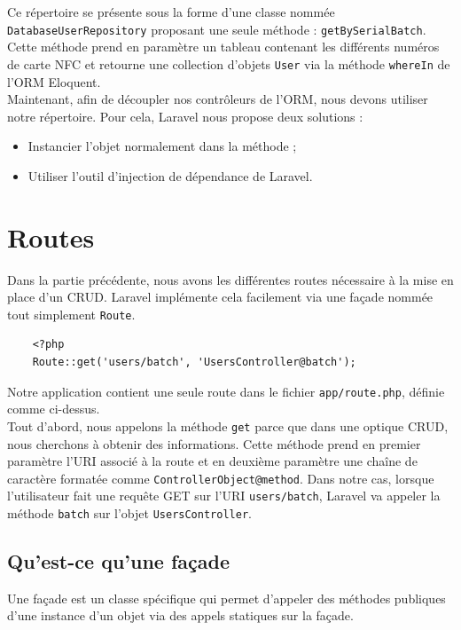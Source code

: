 		Ce répertoire se présente sous la forme d'une classe nommée \verb|DatabaseUserRepository| proposant une seule méthode : \verb|getBySerialBatch|. Cette méthode prend en paramètre un tableau contenant les différents numéros de carte NFC et retourne une collection d'objets \verb|User| via la méthode \verb|whereIn| de l'ORM Eloquent.\\

		Maintenant, afin de découpler nos contrôleurs de l'ORM, nous devons utiliser notre répertoire. Pour cela, Laravel nous propose deux solutions :
		\begin{itemize}
			\item Instancier l'objet normalement dans la méthode ;
			\item Utiliser l'outil d'injection de dépendance de Laravel.
		\end{itemize}

\section{Routes}
	Dans la partie précédente, nous avons les différentes routes nécessaire à la mise en place d'un CRUD. Laravel implémente cela facilement via une façade nommée tout simplement \verb|Route|.

	\begin{verbatim}
	<?php
	Route::get('users/batch', 'UsersController@batch');
	\end{verbatim}
	Notre application contient une seule route dans le fichier \verb|app/route.php|, définie comme ci-dessus.\\

	Tout d'abord, nous appelons la méthode \verb|get| parce que dans une optique CRUD, nous cherchons à obtenir des informations. Cette méthode prend en premier paramètre l'URI associé à la route et en deuxième paramètre une chaîne de caractère  formatée comme \verb|ControllerObject@method|. Dans notre cas, lorsque l'utilisateur fait une requête GET sur l'URI \verb|users/batch|, Laravel va appeler la méthode \verb|batch| sur l'objet \verb|UsersController|.

	\subsection{Qu'est-ce qu'une façade}
		Une façade est un classe spécifique qui permet d'appeler des méthodes publiques d'une instance d'un objet via des appels statiques sur la façade.\\


